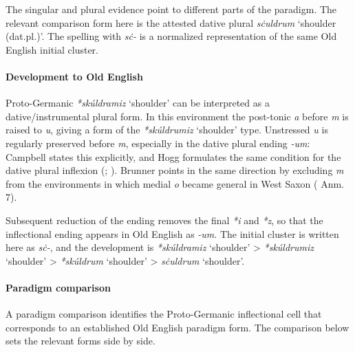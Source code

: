 \documentclass[
  british,
  a4paper,
]{article}
\providecommand{\Recon}[1]{\emph{*#1}}
\begin{document}
The singular and plural evidence point to different parts of the
paradigm. The relevant comparison form here is the attested dative
plural {\emph{sċuldrum}} `shoulder (dat.pl.)'. The spelling with
\emph{sċ-} is a normalized representation of the same Old English
initial cluster.

\paragraph{Development to Old
English}\label{development-to-old-english-142}

Proto-Germanic \Recon{skúldramiz} `shoulder' can be interpreted as a
dative/instrumental plural form. In this environment the post-tonic
\emph{a} before \emph{m} is raised to \emph{u}, giving a form of the
\Recon{skúldrumiz} `shoulder' type. Unstressed \emph{u} is regularly
preserved before \emph{m}, especially in the dative plural ending
\emph{-um}: Campbell states this explicitly, and Hogg formulates the
same condition for the dative plural inflexion
(;
). Brunner
points in the same direction by excluding \emph{m} from the environments
in which medial \emph{o} became general in West Saxon
( Anm. 7).

Subsequent reduction of the ending removes the final \emph{*i} and
\emph{*z}, so that the inflectional ending appears in Old English as
\emph{-um}. The initial cluster is written here as \emph{sċ-}, and the
development is \Recon{skúldramiz} `shoulder' \textgreater{}
\Recon{skúldrumiz} `shoulder' \textgreater{} \Recon{skúldrum} `shoulder'
\textgreater{} {\emph{sċuldrum}} `shoulder'.

\paragraph{Paradigm comparison}\label{paradigm-comparison-18}

A paradigm comparison identifies the Proto-Germanic inflectional cell
that corresponds to an established Old English paradigm form. The
comparison below sets the relevant forms side by side.
\end{document}
